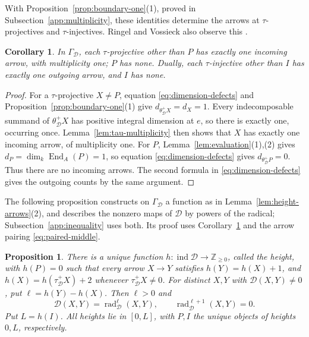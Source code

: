 \documentclass[a4paper,reqno,10pt]{amsart}
\newtheorem{proposition}[theorem]{Proposition}
\newtheorem{corollary}[theorem]{Corollary}
\theoremstyle{definition}
\numberwithin{equation}{section}
\DeclareMathOperator{\ind}{ind}
\DeclareMathOperator{\End}{End}
\DeclareMathOperator{\rad}{rad}
\newcommand{\cD}{\mathcal D}
\begin{document}
With Proposition~\ref{prop:boundary-one}(1), proved in
Subsection~\ref{app:multiplicity}, these identities determine the arrows
at \(\tau\)-projectives and \(\tau\)-injectives. Ringel and Vossieck also
observe this \cite[Section~1, p.~218]{RV}.
\begin{corollary}\label{cor:boundary-arrows}
In \(\Gamma_{\cD}\), each \(\tau\)-projective other than \(P\) has exactly one incoming
arrow, with multiplicity one; \(P\) has none. Dually, each
\(\tau\)-injective other than \(I\) has exactly one outgoing arrow,
and \(I\) has none.
\end{corollary}
\begin{proof}
For a \(\tau\)-projective \(X\ne P\), equation
\eqref{eq:dimension-defects} and Proposition~\ref{prop:boundary-one}(1)
give \(d_{\theta_{\cD}^+X}=d_X=1\).
Every indecomposable summand of \(\theta_{\cD}^+X\) has positive integral
dimension at \(e\), so there is exactly one, occurring once. Lemma~\ref{lem:tau-multiplicity}
then shows that \(X\) has exactly one incoming arrow, of multiplicity one. For \(P\), Lemma~\ref{lem:evaluation}(1),(2)
gives \(d_P=\dim_k\End_A(P)=1\), so equation
\eqref{eq:dimension-defects} gives \(d_{\theta_{\cD}^+P}=0\). Thus there are no
incoming arrows. The second formula in \eqref{eq:dimension-defects}
gives the outgoing counts by the same argument.
\end{proof}

The following proposition constructs on \(\Gamma_{\cD}\) a function as
in Lemma~\ref{lem:height-arrows}(2), and describes the nonzero maps of
\(\cD\) by powers of the radical; Subsection~\ref{app:inequality} uses
both. Its proof uses Corollary~\ref{cor:boundary-arrows} and the arrow
pairing \eqref{eq:paired-middle}.
\begin{proposition}\label{prop:height}
There is a unique function \(h:\ind\cD\to\mathbb Z_{\geq0}\), called
the \emph{height}, with \(h(P)=0\)
such that every arrow \(X\to Y\) satisfies \(h(Y)=h(X)+1\), and
\(h(X)=h(\tau_{\cD}^+X)+2\) whenever \(\tau_{\cD}^+X\ne0\).
For distinct \(X,Y\) with \(\cD(X,Y)\ne0\), put \(\ell=h(Y)-h(X)\).
Then \(\ell>0\) and
\begin{equation}\label{eq:height-radical}
 \cD(X,Y)=\rad_{\cD}^{\ell}(X,Y),\qquad
 \rad_{\cD}^{\ell+1}(X,Y)=0.
\end{equation}
Put \(L=h(I)\). All heights lie in \([0,L]\), with \(P,I\) the unique
objects of heights \(0,L\), respectively.
\end{proposition}
\end{document}
